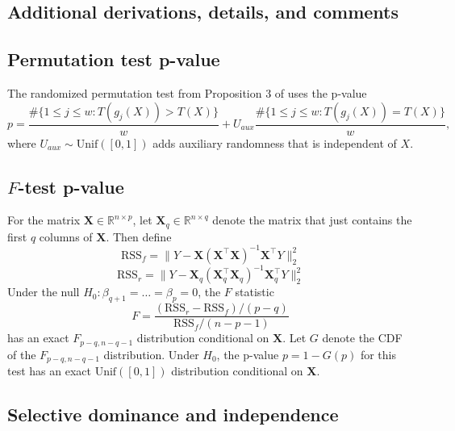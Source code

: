 \documentclass{article}
\newcommand{\R}{\mathbb{R}}
\newcommand{\X}{\boldsymbol{X}}
\begin{document}



\begin{appendix}

\section{Additional derivations, details, and comments}

\subsection{Permutation test p-value}
\label{sec:perm_test_appdx}

The randomized permutation test from Proposition 3 of \cite{Hemerik} uses the p-value
\begin{equation*}
    p = \frac{\#\{1 \leq j \leq w : T(g_j(X)) > T(X) \}}{w} + U_{aux} \frac{\#\{1 \leq j \leq w : T(g_j(X)) = T(X) \}}{w},
\end{equation*}
where $U_{aux} \sim \text{Unif}([0, 1])$ adds auxiliary randomness that is independent of $X$.

\subsection{$F$-test p-value}
\label{sec:f_test_appdx}

For the matrix $\X \in \R^{n \times p}$, let $\X_q \in \R^{n \times q}$ denote the matrix that just contains the first $q$ columns of $\X$.
Then define 
\begin{equation*}
    \text{RSS}_f = \|Y -  \X (\X^\top \X)^{-1} \X^\top Y\|^2_2
\end{equation*}
\begin{equation*}
    \text{RSS}_r = \|Y -  \X_q (\X_q^\top \X_q)^{-1} \X_q^\top Y\|^2_2
\end{equation*}
Under the null $H_0 : \beta_{q+1} = \dots = \beta_p = 0$, the $F$ statistic 
\begin{equation*}
    F = \frac{(\text{RSS}_r - \text{RSS}_f)/(p-q)}{\text{RSS}_f/(n-p-1)}
\end{equation*}
has an exact $F_{p-q, n-q-1}$ distribution conditional on $\X$. Let $G$ denote the CDF of the $F_{p-q, n-q-1}$ distribution. Under $H_0$, the p-value $p = 1 - G(p)$ for this test has an exact $\text{Unif}([0, 1])$ distribution conditional on $\X$.

\subsection{Selective dominance and independence}
\label{sec:sel_dom_independence}


\end{appendix}
\end{document}
